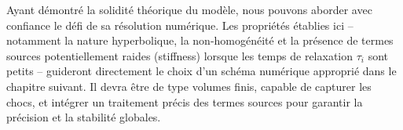 Ayant démontré la solidité théorique du modèle, nous pouvons aborder avec confiance le défi de sa résolution numérique. Les propriétés établies ici – notamment la nature hyperbolique, la non-homogénéité et la présence de termes sources potentiellement raides (stiffness) lorsque les temps de relaxation $\tau_i$ sont petits – guideront directement le choix d'un schéma numérique approprié dans le chapitre suivant. Il devra être de type volumes finis, capable de capturer les chocs, et intégrer un traitement précis des termes sources pour garantir la précision et la stabilité globales.